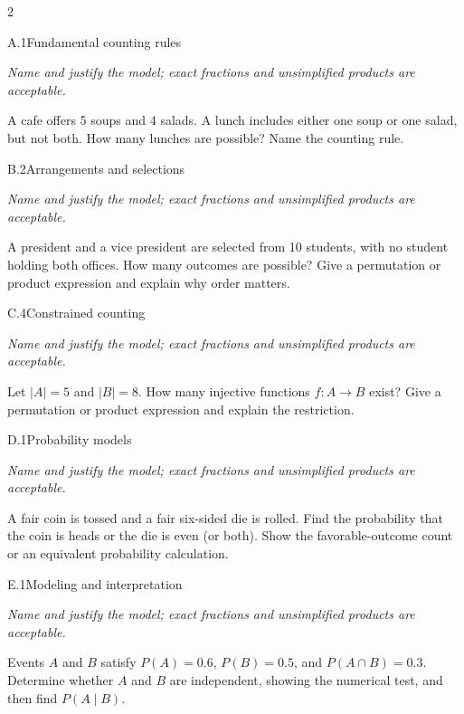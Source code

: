 \documentclass[9pt]{extarticle}
\begin{document}
\begin{multicols}{2}
\begin{CoreProblem}{A.1}{Fundamental counting rules}
{\scriptsize\textit{Name and justify the model; exact fractions and unsimplified products are acceptable.}\par}
A cafe offers 5 soups and 4 salads. A lunch includes either one soup
    or one salad, but not both. How many lunches are possible? Name the counting
    rule.
\end{CoreProblem}
\begin{CoreProblem}{B.2}{Arrangements and selections}
{\scriptsize\textit{Name and justify the model; exact fractions and unsimplified products are acceptable.}\par}
A president and a vice president are selected from 10 students, with
    no student holding both offices. How many outcomes are possible? Give a
    permutation or product expression and explain why order matters.
\end{CoreProblem}
\begin{CoreProblem}{C.4}{Constrained counting}
{\scriptsize\textit{Name and justify the model; exact fractions and unsimplified products are acceptable.}\par}
Let $|A|=5$ and $|B|=8$. How many injective functions $f:A\to B$
    exist? Give a permutation or product expression and explain the restriction.
\end{CoreProblem}
\columnbreak
\begin{CoreProblem}{D.1}{Probability models}
{\scriptsize\textit{Name and justify the model; exact fractions and unsimplified products are acceptable.}\par}
A fair coin is tossed and a fair six-sided die is rolled. Find the
    probability that the coin is heads or the die is even (or both). Show the
    favorable-outcome count or an equivalent probability calculation.
\end{CoreProblem}
\begin{CoreProblem}{E.1}{Modeling and interpretation}
{\scriptsize\textit{Name and justify the model; exact fractions and unsimplified products are acceptable.}\par}
Events $A$ and $B$ satisfy $P(A)=0.6$, $P(B)=0.5$, and
    $P(A\cap B)=0.3$. Determine whether $A$ and $B$ are independent, showing
    the numerical test, and then find $P(A\mid B)$.
\end{CoreProblem}
\end{multicols}
\CoreWorkArea
\FormBreak
{}
\end{document}

